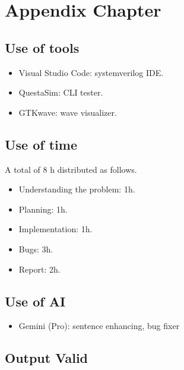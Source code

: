 \appendix
\chapter{Appendix Chapter}

\section{Use of tools}

\begin{itemize}
    \item Visual Studio Code: systemverilog IDE.
    \item QuestaSim: CLI tester.
    \item GTKwave: wave visualizer.
\end{itemize}

\section{Use of time}

A total of 8 h distributed as follows.

\begin{itemize}
    \item Understanding the problem: 1h.
    \item Planning: 1h.
    \item Implementation: 1h.
    \item Bugs: 3h.
    \item Report: 2h.
\end{itemize}

\section{Use of AI}

\begin{itemize}
    \item Gemini (Pro): sentence enhancing, bug fixer
\end{itemize}

\newpage

\section{Output Valid}


\label{out:base}

